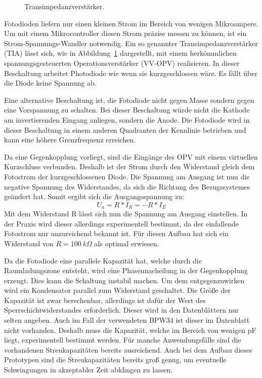 \begin{figure} \centering
	
	\caption{Transimpedanzverstärker.}
	\label{fig:transimpedanzverstaerker}
\end{figure}

Fotodioden liefern nur einen kleinen Strom im Bereich von wenigen Mikroampere.
Um mit einem Mikrocontroller diesen Strom präzise messen zu können, ist ein Strom-Spannungs-Wandler notwendig.
Ein so genannter Transimpedanzverstärker (TIA) lässt sich, wie in Abbildung~\ref{fig:transimpedanzverstaerker} dargestellt, mit einem herkömmlichen spannungsgesteuerten Operationsverstärker (VV-OPV) realisieren.
In dieser Beschaltung arbeitet Photodiode wie wenn sie kurzgeschlossen wäre.
Es fällt über die Diode keine Spannung ab.

Eine alternative Beschaltung ist, die Fotodiode nicht gegen Masse sondern gegen eine Vorspannung zu schalten.
Bei dieser Beschaltung würde nicht die Kathode am invertierenden Eingang anliegen, sondern die Anode.
Die Fotodiode wird in dieser Beschaltung in einem anderen Quadranten der Kennlinie betrieben und kann eine höhere Grenzfrequenz erreichen. \cite[80]{book:pulseOximeters} \cite[89]{book:bauelementGrundschaltungen}

Da eine Gegenkopplung vorliegt, sind die Eingänge des OPV mit einem virtuellen Kurzschluss verbunden.
Deshalb ist der Strom durch den Widerstand gleich dem Fotostrom der kurzgeschlossenen Diode.
Die Spannung am Ausgang ist nun die negative Spannung des Widerstandes, da sich die Richtung des Bezugssystemes geändert hat.
Somit ergibt sich die Ausgangsspannung zu:
\begin{equation}
U_a = R * I_R = - R * I_E
\end{equation}
Mit dem Widerstand R lässt sich nun die Spannung am Ausgang einstellen.
In der Praxis wird dieser allerdings experimentell bestimmt, da der einfallende Fotostrom nur unzureichend bekannt ist.
Für diesen Aufbau hat sich ein Widerstand von $R=100~k\Omega$ als optimal erwiesen.

Da die Fotodiode eine parallele Kapazität hat, welche durch die Raumladungszone entsteht, wird eine Phasennacheilung in der Gegenkopplung erzeugt.
Dies kann die Schaltung instabil machen.
Um dem entgegenzuwirken wird ein Kondensator parallel zum Widerstand geschaltet.
Die Größe der Kapazität ist zwar berechenbar, allerdings ist dafür der Wert des Sperrschichtwiderstandes erforderlich.
Dieser wird in den Datenblättern nur selten angeben.
Auch im Fall der verwendeten BPW34 ist dieser im Datenblatt nicht vorhanden.
Deshalb muss die Kapazität, welche im Bereich von wenigen pF liegt, experimentell bestimmt werden.
Für manche Anwendungsfälle sind die vorhandenen Streukapazitäten bereits ausreichend.
Auch bei dem Aufbau dieses Prototypen sind die Streukapazitäten bereits groß genug, um eventuelle Schwingungen in akzeptabler Zeit abklingen zu lassen.

